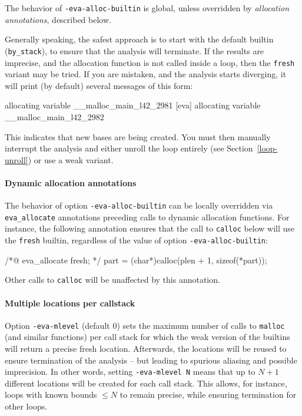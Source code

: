 \documentclass{frama-c-book}
\begin{document}
The behavior of \lstinline|-eva-alloc-builtin| is global, unless overridden by
{\em allocation annotations}, described below.

Generally speaking, the safest approach is to start with the default builtin
(\texttt{by\_stack}), to ensure that the analysis will terminate.
If the results are imprecise, and the allocation function is not called inside
a loop, then the \texttt{fresh} variant may be tried. If you are mistaken, and the
analysis starts diverging, it will print (by default) several messages of this
form:

\begin{listing-nonumber}
[eva] allocating variable __malloc_main_l42_2981
[eva] allocating variable __malloc_main_l42_2982
\end{listing-nonumber}

This indicates that new bases are being created.
You must then manually interrupt the analysis and either unroll the loop
entirely (see Section~\ref{loop-unroll}) or use a weak variant.

\paragraph{Dynamic allocation annotations}

The behavior of option \lstinline|-eva-alloc-builtin| can be locally overridden
via \lstinline|eva_allocate| annotations preceding calls to dynamic allocation
functions.
For instance, the following annotation ensures that the call to
\lstinline|calloc| below will use the \lstinline|fresh| builtin,
regardless of the value of option \lstinline|-eva-alloc-builtin|:

\begin{listing-nonumber}
  /*@ eva_allocate fresh; */
  part = (char*)calloc(plen + 1, sizeof(*part));
\end{listing-nonumber}

Other calls to \lstinline|calloc| will be unaffected by this annotation.

\paragraph{Multiple locations per callstack}

Option \lstinline|-eva-mlevel| (default 0) sets the maximum number of calls to
\lstinline|malloc| (and similar functions) per call stack for which the
weak version of the builtins will return a precise fresh location.
Afterwards, the locations will be reused to ensure termination of the analysis --
but leading to spurious aliasing and possible imprecision.
In other words, setting \lstinline|-eva-mlevel N| means that up to $N+1$
different locations will be created for each call stack. This allows,
for instance, loops with known bounds $\leq N$ to remain precise, while ensuring
termination for other loops.
\end{document}

